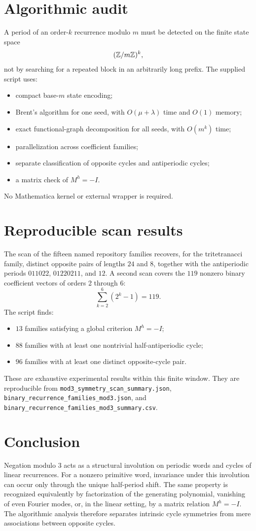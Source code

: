 \documentclass[11pt,a4paper]{article}
\begin{document}
\section{Algorithmic audit}
A period of an order-\(k\) recurrence modulo \(m\) must be detected on the finite state space \[(\mathbb Z/m\mathbb Z)^k,\] not by searching for a repeated block in an arbitrarily long prefix. The supplied script uses: \begin{itemize}\item compact base-\(m\) state encoding;\item Brent's algorithm for one seed, with \(O(\mu+\lambda)\) time and \(O(1)\) memory;\item exact functional-graph decomposition for all seeds, with \(O(m^k)\) time;\item parallelization across coefficient families;\item separate classification of opposite cycles and antiperiodic cycles;\item a matrix check of \(M^h=-I\).\end{itemize} No Mathematica kernel or external wrapper is required.
\section{Reproducible scan results}
The scan of the fifteen named repository families recovers, for the tritetranacci family, distinct opposite pairs of lengths \(24\) and \(8\), together with the antiperiodic periods \(011022\), \(01220211\), and \(12\). A second scan covers the \(119\) nonzero binary coefficient vectors of orders 2 through 6: \[\sum_{k=2}^{6}(2^k-1)=119.\] The script finds: \begin{itemize}\item \(13\) families satisfying a global criterion \(M^h=-I\);\item \(88\) families with at least one nontrivial half-antiperiodic cycle;\item \(96\) families with at least one distinct opposite-cycle pair.\end{itemize} These are exhaustive experimental results within this finite window. They are reproducible from \texttt{mod3\_symmetry\_scan\_summary.json}, \texttt{binary\_recurrence\_families\_mod3.json}, and \texttt{binary\_recurrence\_families\_mod3\_summary.csv}.
\section*{Conclusion}
Negation modulo 3 acts as a structural involution on periodic words and cycles of linear recurrences. For a nonzero primitive word, invariance under this involution can occur only through the unique half-period shift. The same property is recognized equivalently by factorization of the generating polynomial, vanishing of even Fourier modes, or, in the linear setting, by a matrix relation \(M^h=-I\). The algorithmic analysis therefore separates intrinsic cycle symmetries from mere associations between opposite cycles.
\end{document}
